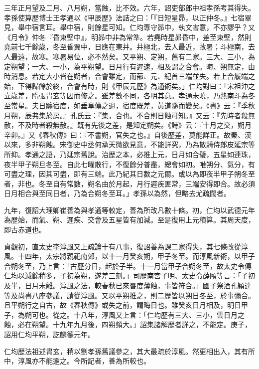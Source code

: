 \begin{pinyinscope}
 三年正月望及二月、八月朔，當蝕，比不效。六年，詔吏部郎中祖孝孫考其得失。孝孫使算歷博士王孝通以《甲辰歷》法詰之曰：「『日短星昴，以正仲冬。』七宿畢見，舉中宿言耳。舉中宿，則餘星可知。仁均專守昴中，執文害意，不亦謬乎？又《月令》仲冬『昏東壁中』，明昴中非為常準。若堯時星昴昏中，差至東壁，然則堯前七千餘歲，冬至昏翼中，日應在東井。井極北，去人最近，故暑；斗極南，去人最遠，故寒。寒暑易位，必不然矣。又平朔、定朔，舊有二家。三大、三小，為定朔望；一大、一小，為平朔望。日月行有遲速，相及謂之合會。晦、朔無定，由時消息。若定大小皆在朔者，合會雖定，而蔀、元、紀首三端並失。若上合履端之始，下得歸餘於終，合會有時，則《甲辰元歷》為通術矣。」仁均對曰：「宋祖沖之立歲差，隋張胄玄等因而修之。雖差數不同，各明其意。孝通未曉，乃熱南斗為冬至常星。夫日躔宿度，如垂阜傳之過，宿度既差，黃道隨而變矣。《書》云：『季秋月朔，辰弗集於房。』孔氏云：『集，合也。不合則日蝕可知。』又云：『先時者殺無赦，不及時者殺無赦。』既有先後之差，是知定朔矣。《詩》云：『十月之交，朔月辛卯。』又《春秋傳》曰：『不書朔，官失之也。』自後歷差，莫能詳正。故秦、漢以來，多非朔蝕。宋御史中丞何承天微欲見意，不能詳究，乃為散騎侍郎皮延宗等所抑。孝通之語，乃延宗舊說。治歷之本，必推上元，日月如合璧，五星如連珠，夜半甲子朔旦冬至。自此七曜散行，不復餘分普盡，總會如初。唯朔分、氣分，有可盡之理，因其可盡，即有三端。此乃紀其日數之元爾。或以為即夜半甲子朔冬至者，非也。冬至自有常數，朔名由於月起，月行遲疾匪常，三端安得即合。故必須日月相合與至同日者，乃為合朔冬至耳。」孝孫以為然，但略去尤疏闊者。



 九年，復詔大理卿崔善為與孝通等較定，善為所改凡數十條。初，仁均以武德元年為歷始，而氣、朔、遲疾、交會及五星皆有加減。至是復用上元積算。其周天度，即古赤道也。



 貞觀初，直太史李淳風又上疏論十有八事，復詔善為課二家得失，其七條改從淳風。十四年，太宗將親祀南郊，以十一月癸亥朔，甲子冬至。而淳風新術，以甲子合朔冬至，乃上言：「古歷分日，起於子半。十一月當甲子合朔冬至，故太史令傅仁均以減餘稍多，子初為朔，遂差三刻。」司歷南宮子明、太史令薛頤等言：「子初及半，日月未離。淳風之法，較春秋已來晷度薄蝕，事皆符合。」國子祭酒孔穎達等及尚書八座參議，請從淳風。又以平朔推之，則二歷皆以朔日冬至，於事彌合。且平朔行之自古，故《春秋傳》或失之前，謂晦日也。雖癸亥日月相及，明日甲子，為朔可也。從之。十八年，淳風又上言：「仁均歷有三大、三小，雲日月之蝕，必在朔望。十九年九月後，四朔頻大。」詔集諸解歷者詳之，不能定。庚子，詔用仁均平朔，訖麟德元年。



 仁均歷法祖述胄玄，稍以劉孝孫舊議參之，其大最疏於淳風。然更相出入，其有所中，淳風亦不能逾之。今所記者，善為所較也。




\end{pinyinscope}
